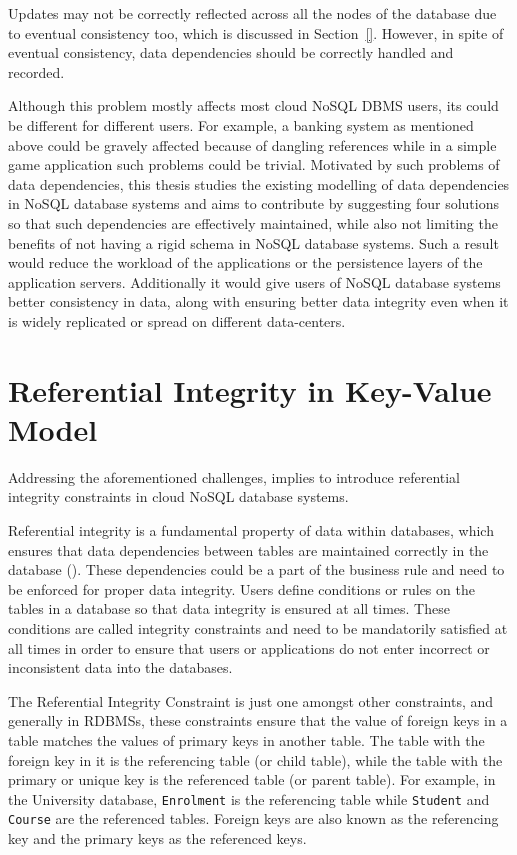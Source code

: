 Updates may not be correctly reflected across all the nodes of the database due
to eventual consistency too, which is discussed in Section~\ref{}. However, in
spite of eventual consistency, data dependencies should be correctly handled and
recorded.

Although this problem mostly affects most cloud \ac{NoSQL} \ac{DBMS} users, its
could be different for different users. For example, a banking system as
mentioned above could be gravely affected because of dangling references while
in a simple game application such problems could be trivial.
Motivated by such problems of data dependencies, this thesis studies the
existing modelling of data dependencies in \ac{NoSQL} database systems and aims
to contribute by suggesting four solutions so that such dependencies are
effectively maintained, while also not limiting the benefits of not having a
rigid schema in \ac{NoSQL} database systems. Such a result would 
reduce the workload of the applications or the persistence layers of the application
servers. Additionally it would give users of \ac{NoSQL} database systems
better consistency in data, along with ensuring better data integrity even when
it is widely replicated or spread on different data-centers.



\section{Referential Integrity in Key-Value
Model}\label{s:referential-integrity}
Addressing the aforementioned challenges, implies to introduce referential
integrity constraints in cloud \ac{NoSQL} database systems.

Referential integrity is a fundamental property of data within databases, which
ensures that data dependencies between tables are maintained correctly in the
database (). These dependencies could be a part of the
business rule and need to be enforced for proper data integrity. Users define
conditions or rules on the tables in a database so that data integrity is
ensured at all times. These conditions are called integrity constraints and need
to be mandatorily satisfied at all times in order to ensure that users or
applications do not enter incorrect or inconsistent data into the databases.

The Referential Integrity Constraint is just one amongst other constraints, and
generally in \acp{RDBMS}, these constraints ensure that the value of foreign
keys in a table matches the values of primary keys in another table. The table
with the foreign key in it is the referencing table (or child table), while the
table with the primary or unique key is the referenced table (or parent table).
For example, in the University database, \texttt{Enrolment} is the
referencing table while \texttt{Student} and \texttt{Course} are the
referenced tables. Foreign keys are also known as the referencing key and
the primary keys as the referenced keys.

